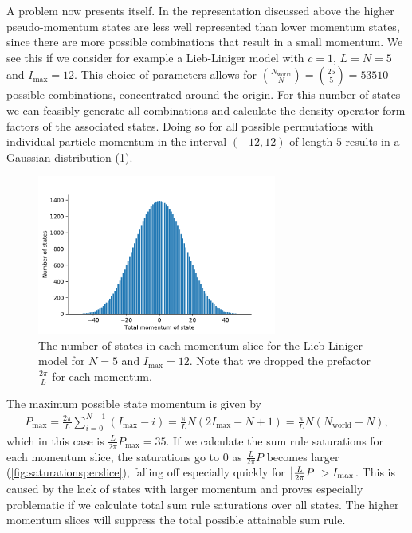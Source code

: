 \documentclass[11pt, a4paper]{report} %
\begin{document}
A problem now presents itself.
In the representation discussed above the higher pseudo-momentum states are less well represented than lower momentum states, since there are more possible combinations that result in a small momentum.
We see this if we consider for example a Lieb-Liniger model with \(c=1\), \(L=N=5\) and \(I_{\max} =12\).
This choice of parameters allows for \(\binom{N_{\mathrm{world}}}{N}=\binom{25}{5}=53510\) possible combinations, concentrated around the origin.
For this number of states we can feasibly generate all combinations and calculate the density operator form factors of the associated states.
Doing so for all possible permutations with individual particle momentum in the interval \((-12, 12)\) of length \(5\) results in a Gaussian distribution (\cref{fig:no_of_states}).
\begin{figure}[tb]
  \centering
  \includegraphics[width=0.7\textwidth]{no_of_states}
  \caption{The number of states in each momentum slice for the Lieb-Liniger model for \(N=5\) and \(I_{\max}=12\). Note that we dropped the prefactor \(\frac{2\pi}{L}\) for each momentum.}\label{fig:no_of_states}
\end{figure}
The maximum possible state momentum is given by
\begin{align}
  \label{eq:50}
  P_{\max} = \frac{2\pi}{L}\sum_{i=0}^{N-1}(I_{\max}-i) = \frac{\pi}{L}N (2 I_{\max} -N +1) = \frac{\pi}{L}N (N_{\mathrm{world}} -N),
\end{align}
which in this case is \(\frac{L}{2\pi}P_{\max} = 35\).
If we calculate the sum rule saturations for each momentum slice, the saturations go to 0 as \(\frac{L}{2\pi}P\) becomes larger (\cref{fig:saturationsperslice}), falling off especially quickly for \(\abs{\frac{L}{2\pi}P}>I_{\max}\).
This is caused by the lack of states with larger momentum and proves especially problematic if we calculate total sum rule saturations over all states.
The higher momentum slices will suppress the total possible attainable sum rule.
\end{document}
